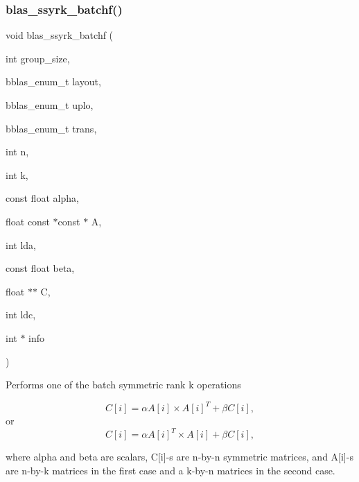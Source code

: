 \subsubsection{\texorpdfstring{blas\+\_\+ssyrk\+\_\+batchf()}{blas\_ssyrk\_batchf()}}
{\footnotesize\ttfamily void blas\+\_\+ssyrk\+\_\+batchf (\begin{DoxyParamCaption}\item[{int}]{group\+\_\+size,  }\item[{bblas\+\_\+enum\+\_\+t}]{layout,  }\item[{bblas\+\_\+enum\+\_\+t}]{uplo,  }\item[{bblas\+\_\+enum\+\_\+t}]{trans,  }\item[{int}]{n,  }\item[{int}]{k,  }\item[{const float}]{alpha,  }\item[{float const $\ast$const $\ast$}]{A,  }\item[{int}]{lda,  }\item[{const float}]{beta,  }\item[{float $\ast$$\ast$}]{C,  }\item[{int}]{ldc,  }\item[{int $\ast$}]{info }\end{DoxyParamCaption})}

Performs one of the batch symmetric rank k operations

\[ C[i] = \alpha A[i] \times A[i]^T + \beta C[i], \] or \[ C[i] = \alpha A[i]^T \times A[i] + \beta C[i], \]

where alpha and beta are scalars, C\mbox{[}i\mbox{]}-\/s are n-\/by-\/n symmetric matrices, and A\mbox{[}i\mbox{]}-\/s are n-\/by-\/k matrices in the first case and a k-\/by-\/n matrices in the second case.


